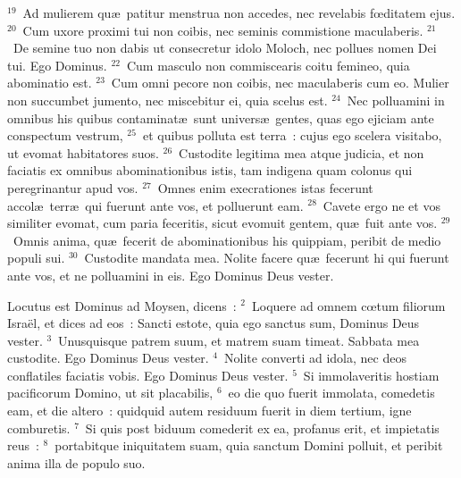 ${}^{19}$~Ad mulierem qu\ae\ patitur menstrua non accedes, nec revelabis fœditatem ejus.
${}^{20}$~Cum uxore proximi tui non coibis, nec seminis commistione maculaberis.
${}^{21}$~De semine tuo non dabis ut consecretur idolo Moloch, nec pollues nomen Dei tui. Ego Dominus.
${}^{22}$~Cum masculo non commiscearis coitu femineo, quia abominatio est.
${}^{23}$~Cum omni pecore non coibis, nec maculaberis cum eo. Mulier non succumbet jumento, nec miscebitur ei, quia scelus est.
${}^{24}$~Nec polluamini in omnibus his quibus contaminat\ae\ sunt univers\ae\ gentes, quas ego ejiciam ante conspectum vestrum,
${}^{25}$~et quibus polluta est terra~: cujus ego scelera visitabo, ut evomat habitatores suos.
${}^{26}$~Custodite legitima mea atque judicia, et non faciatis ex omnibus abominationibus istis, tam indigena quam colonus qui peregrinantur apud vos.
${}^{27}$~Omnes enim execrationes istas fecerunt accol\ae\ terr\ae\ qui fuerunt ante vos, et polluerunt eam.
${}^{28}$~Cavete ergo ne et vos similiter evomat, cum paria feceritis, sicut evomuit gentem, qu\ae\ fuit ante vos.
${}^{29}$~Omnis anima, qu\ae\ fecerit de abominationibus his quippiam, peribit de medio populi sui.
${}^{30}$~Custodite mandata mea. Nolite facere qu\ae\ fecerunt hi qui fuerunt ante vos, et ne polluamini in eis. Ego Dominus Deus vester.

\lettrine[lines=3,image=true,loversize=0.05,lraise=-0.03]{L}{}ocutus est Dominus ad Moysen, dicens~:
${}^{2}$~Loquere ad omnem cœtum filiorum Isra\"el, et dices ad eos~: Sancti estote, quia ego sanctus sum, Dominus Deus vester.
${}^{3}$~Unusquisque patrem suum, et matrem suam timeat. Sabbata mea custodite. Ego Dominus Deus vester.
${}^{4}$~Nolite converti ad idola, nec deos conflatiles faciatis vobis. Ego Dominus Deus vester.
${}^{5}$~Si immolaveritis hostiam pacificorum Domino, ut sit placabilis,
${}^{6}$~eo die quo fuerit immolata, comedetis eam, et die altero~: quidquid autem residuum fuerit in diem tertium, igne comburetis.
${}^{7}$~Si quis post biduum comederit ex ea, profanus erit, et impietatis reus~:
${}^{8}$~portabitque iniquitatem suam, quia sanctum Domini polluit, et peribit anima illa de populo suo.



